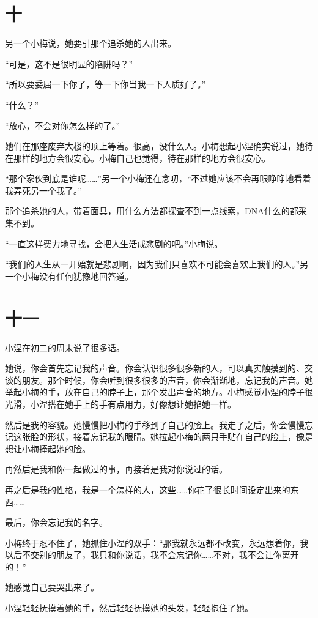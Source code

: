 \documentclass[12pt,a4paper]{ctexart}
\begin{document}
\section{十}

另一个小梅说，她要引那个追杀她的人出来。

“可是，这不是很明显的陷阱吗？”

“所以要委屈一下你了，等一下你当我一下人质好了。”

“什么？”

“放心，不会对你怎么样的了。”

她们在那座废弃大楼的顶上等着。很高，没什么人。小梅想起小涅确实说过，她待在那样的地方会很安心。小梅自己也觉得，待在那样的地方会很安心。

“那个家伙到底是谁呢……”另一个小梅还在念叨，“不过她应该不会再眼睁睁地看着我弄死另一个我了。”

那个追杀她的人，带着面具，用什么方法都探查不到一点线索，DNA什么的都采集不到。

“一直这样费力地寻找，会把人生活成悲剧的吧。”小梅说。

“我们的人生从一开始就是悲剧啊，因为我们只喜欢不可能会喜欢上我们的人。”另一个小梅没有任何犹豫地回答道。

\section{十一}

小涅在初二的周末说了很多话。

她说，你会首先忘记我的声音。你会认识很多很多新的人，可以真实触摸到的、交谈的朋友。那个时候，你会听到很多很多的声音，你会渐渐地，忘记我的声音。她举起小梅的手，放在自己的脖子上，那个发出声音的地方。小梅感觉小涅的脖子很光滑，小涅搭在她手上的手有点用力，好像想让她掐她一样。

然后是我的容貌。她慢慢把小梅的手移到了自己的脸上。我走了之后，你会慢慢忘记这张脸的形状，接着忘记我的眼睛。她拉起小梅的两只手贴在自己的脸上，像是想让小梅捧起她的脸。

再然后是我和你一起做过的事，再接着是我对你说过的话。

再之后是我的性格，我是一个怎样的人，这些……你花了很长时间设定出来的东西……

最后，你会忘记我的名字。

小梅终于忍不住了，她抓住小涅的双手：“那我就永远都不改变，永远想着你，我以后不交别的朋友了，我只和你说话，我不会忘记你……不对，我不会让你离开的！”

她感觉自己要哭出来了。

小涅轻轻抚摸着她的手，然后轻轻抚摸她的头发，轻轻抱住了她。
\end{document}
